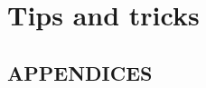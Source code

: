 \documentclass[letterpaper,12pt,titlepage,oneside,final]{book}
\begin{document}
 

\doublespacing
\pagestyle{fancy}
\rhead{}
\setlength{\headheight}{30pt}
  
\part{Tips and tricks}
\label{part:tipsAndTricks}
  


\appendix
\chapter*{APPENDICES}


\end{document}
